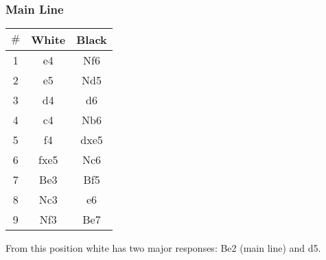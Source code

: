 \documentclass{article}
\newcommand{\smalls}{\par\smallskip}
\begin{document}
        \subsubsection*{Main Line}
        \begin{multicols}{2}
            \showboard
            \smalls
            \begin{tabular}{c|c|c}
                $\#$ & White & Black\\
                \hline
                1 & e4 & Nf6 \\
                2 & e5 & Nd5 \\
                3 & d4 & d6 \\
                4 & c4 & Nb6 \\
                5 & f4 & dxe5 \\
                6 & fxe5 & Nc6 \\
                7 & Be3 & Bf5 \\
                8 & Nc3 & e6 \\
                9 & Nf3 & Be7 \\
            \end{tabular}
        \end{multicols}
        From this position white has two major responses: Be2 (main line) and d5.
\end{document}

